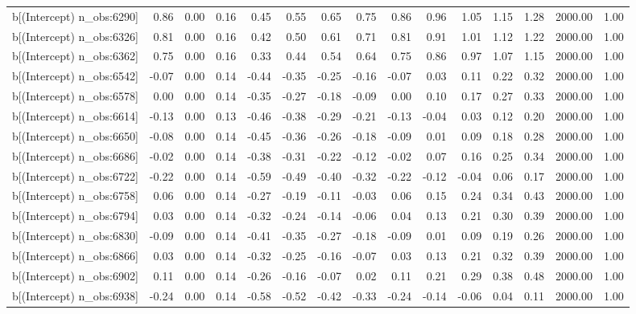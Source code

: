 \begin{table}[ht]
\begin{tabular}{rrrrrrrrrrrrrrr}
  b[(Intercept) n\_obs:6290] & 0.86 & 0.00 & 0.16 & 0.45 & 0.55 & 0.65 & 0.75 & 0.86 & 0.96 & 1.05 & 1.15 & 1.28 & 2000.00 & 1.00 \\ 
  b[(Intercept) n\_obs:6326] & 0.81 & 0.00 & 0.16 & 0.42 & 0.50 & 0.61 & 0.71 & 0.81 & 0.91 & 1.01 & 1.12 & 1.22 & 2000.00 & 1.00 \\ 
  b[(Intercept) n\_obs:6362] & 0.75 & 0.00 & 0.16 & 0.33 & 0.44 & 0.54 & 0.64 & 0.75 & 0.86 & 0.97 & 1.07 & 1.15 & 2000.00 & 1.00 \\ 
  b[(Intercept) n\_obs:6542] & -0.07 & 0.00 & 0.14 & -0.44 & -0.35 & -0.25 & -0.16 & -0.07 & 0.03 & 0.11 & 0.22 & 0.32 & 2000.00 & 1.00 \\ 
  b[(Intercept) n\_obs:6578] & 0.00 & 0.00 & 0.14 & -0.35 & -0.27 & -0.18 & -0.09 & 0.00 & 0.10 & 0.17 & 0.27 & 0.33 & 2000.00 & 1.00 \\ 
  b[(Intercept) n\_obs:6614] & -0.13 & 0.00 & 0.13 & -0.46 & -0.38 & -0.29 & -0.21 & -0.13 & -0.04 & 0.03 & 0.12 & 0.20 & 2000.00 & 1.00 \\ 
  b[(Intercept) n\_obs:6650] & -0.08 & 0.00 & 0.14 & -0.45 & -0.36 & -0.26 & -0.18 & -0.09 & 0.01 & 0.09 & 0.18 & 0.28 & 2000.00 & 1.00 \\ 
  b[(Intercept) n\_obs:6686] & -0.02 & 0.00 & 0.14 & -0.38 & -0.31 & -0.22 & -0.12 & -0.02 & 0.07 & 0.16 & 0.25 & 0.34 & 2000.00 & 1.00 \\ 
  b[(Intercept) n\_obs:6722] & -0.22 & 0.00 & 0.14 & -0.59 & -0.49 & -0.40 & -0.32 & -0.22 & -0.12 & -0.04 & 0.06 & 0.17 & 2000.00 & 1.00 \\ 
  b[(Intercept) n\_obs:6758] & 0.06 & 0.00 & 0.14 & -0.27 & -0.19 & -0.11 & -0.03 & 0.06 & 0.15 & 0.24 & 0.34 & 0.43 & 2000.00 & 1.00 \\ 
  b[(Intercept) n\_obs:6794] & 0.03 & 0.00 & 0.14 & -0.32 & -0.24 & -0.14 & -0.06 & 0.04 & 0.13 & 0.21 & 0.30 & 0.39 & 2000.00 & 1.00 \\ 
  b[(Intercept) n\_obs:6830] & -0.09 & 0.00 & 0.14 & -0.41 & -0.35 & -0.27 & -0.18 & -0.09 & 0.01 & 0.09 & 0.19 & 0.26 & 2000.00 & 1.00 \\ 
  b[(Intercept) n\_obs:6866] & 0.03 & 0.00 & 0.14 & -0.32 & -0.25 & -0.16 & -0.07 & 0.03 & 0.13 & 0.21 & 0.32 & 0.39 & 2000.00 & 1.00 \\ 
  b[(Intercept) n\_obs:6902] & 0.11 & 0.00 & 0.14 & -0.26 & -0.16 & -0.07 & 0.02 & 0.11 & 0.21 & 0.29 & 0.38 & 0.48 & 2000.00 & 1.00 \\ 
  b[(Intercept) n\_obs:6938] & -0.24 & 0.00 & 0.14 & -0.58 & -0.52 & -0.42 & -0.33 & -0.24 & -0.14 & -0.06 & 0.04 & 0.11 & 2000.00 & 1.00 \\ 

\end{tabular}
\end{table}
